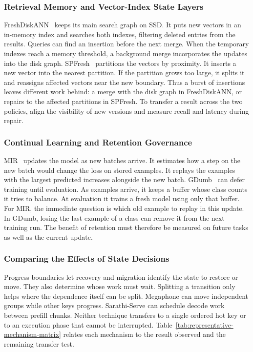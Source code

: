 \documentclass[manuscript]{acmart}
\begin{document}
\subsubsection{Retrieval Memory and Vector-Index State Layers}

FreshDiskANN~\cite{singh2021freshdiskann} keeps its main search graph on SSD. It puts new vectors in an in-memory index and searches both indexes, filtering deleted entries from the results. Queries can find an insertion before the next merge. When the temporary indexes reach a memory threshold, a background merge incorporates the updates into the disk graph. SPFresh~\cite{xu2023spfresh} partitions the vectors by proximity. It inserts a new vector into the nearest partition. If the partition grows too large, it splits it and reassigns affected vectors near the new boundary. Thus a burst of insertions leaves different work behind: a merge with the disk graph in FreshDiskANN, or repairs to the affected partitions in SPFresh. To transfer a result across the two policies, align the visibility of new versions and measure recall and latency during repair.

\subsubsection{Continual Learning and Retention Governance}

MIR~\cite{aljundi2019mir} updates the model as new batches arrive. It estimates how a step on the new batch would change the loss on stored examples. It replays the examples with the largest predicted increases alongside the new batch. GDumb~\cite{prabhu2020gdumb} can defer training until evaluation. As examples arrive, it keeps a buffer whose class counts it tries to balance. At evaluation it trains a fresh model using only that buffer. For MIR, the immediate question is which old example to replay in this update. In GDumb, losing the last example of a class can remove it from the next training run. The benefit of retention must therefore be measured on future tasks as well as the current update.

\subsubsection{Comparing the Effects of State Decisions}

Progress boundaries let recovery and migration identify the state to restore or move. They also determine whose work must wait. Splitting a transition only helps where the dependence itself can be split. Megaphone can move independent groups while other keys progress. Sarathi-Serve can schedule decode work between prefill chunks. Neither technique transfers to a single ordered hot key or to an execution phase that cannot be interrupted. Table~\ref{tab:representative-mechanism-matrix} relates each mechanism to the result observed and the remaining transfer test.
\end{document}
